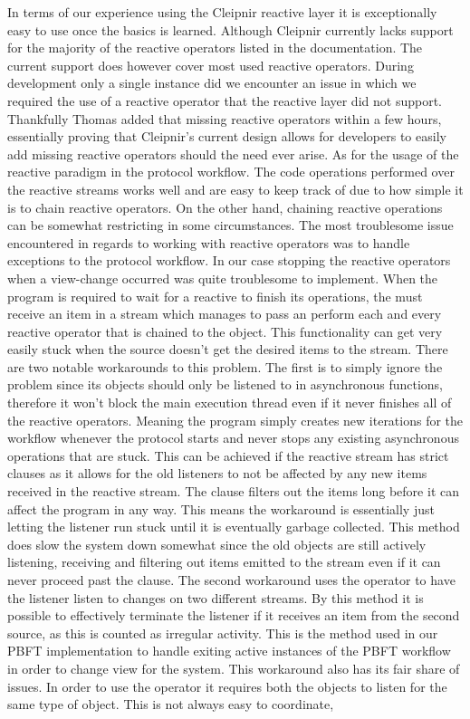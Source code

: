In terms of our experience using the Cleipnir reactive layer it is exceptionally easy to use once the basics is learned. Although Cleipnir currently lacks support for the majority of the reactive operators listed in the documentation. The current support does however cover most used reactive operators. During development only a single instance did we encounter an issue in which we required the use of a reactive operator that the reactive layer did not support. Thankfully Thomas added that missing reactive operators within a few hours, essentially proving that Cleipnir's current design allows for developers to easily add missing reactive operators should the need ever arise. As for the usage of the reactive paradigm in the protocol workflow. The code operations performed over the reactive streams works well and are easy to keep track of due to how simple it is to chain reactive operators. On the other hand, chaining reactive operations can be somewhat restricting in some circumstances. The most troublesome issue encountered in regards to working with reactive operators was to handle exceptions to the protocol workflow. In our case stopping the reactive operators when a view-change occurred was quite troublesome to implement. When the program is required to wait for a reactive  to finish its operations, the  must receive an item in a stream which manages to pass an perform each and every reactive operator that is chained to the  object. This functionality can get very easily stuck when the source doesn't get the desired items to the stream. There are two notable workarounds to this problem. The first is to simply ignore the problem since its  objects should only be listened to in  asynchronous functions, therefore it won't block the main execution thread even if it never finishes all of the reactive operators. Meaning the program simply creates new iterations for the workflow whenever the protocol starts and never stops any existing asynchronous operations that are stuck. This can be achieved if the reactive stream has strict  clauses as it allows for the old listeners to not be affected by any new items received in the reactive stream. The  clause filters out the items long before it can affect the program in any way. This means the workaround is essentially just letting the listener run stuck until it is eventually garbage collected. This method does slow the system down somewhat since the old  objects are still actively listening, receiving and filtering out items emitted to the stream even if it can never proceed past the  clause. The second workaround uses the  operator to have the listener listen to changes on two different streams. By this method it is possible to effectively terminate the listener if it receives an item from the second source, as this is counted as irregular activity. This is the method used in our PBFT implementation to handle exiting active instances of the PBFT workflow in order to change view for the system. This workaround also has its fair share of issues. In order to use the  operator it requires both the  objects to listen for the same type of object. This is not always easy to coordinate, 